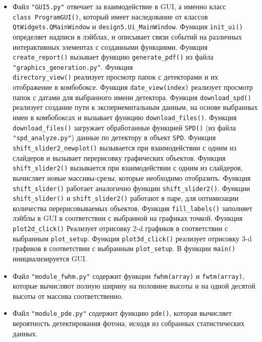 \documentclass[12pt]{article}
\begin{document}
\begin{itemize}
   \item Файл \verb|"GUI5.py"| отвечает за взаимодействие в GUI, а именно класс \\ \verb|class ProgramGUI()|, который имеет наследование от классов \\ \verb|QtWidgets.QMainWindow| и  \verb|design5.Ui_MainWindow|. Функция \verb|init_ui()| определяет надписи в лэйблах, и описывает связи событий на различных интерактивных элементах с созданными функциями. Функция \verb|create_report()| вызывает функцию \verb|generate_pdf()| из файла \verb|"graphics_generation.py"|. Функция \\ \verb|directory_view()| реализует просмотр папок с детекторами и их отображение в комбобоксе. Функция \verb|date_view(index)| реализует просмотр папок с датами для выбранного имени детектора. Функция \verb|download_spd()| реализует создание пути к экспериемнтальным данным, на основе выбранных имен в комбобоксах и вызывает функцию \verb|download_files()|. Функция \verb|download_files()| загружает обработанные функцией \verb|SPD()| (из файла \verb|"spd_analyze.py"|) данные по детектору в объект \verb|SPD|. Функция \verb|shift_slider2_newplot()| вызывается при взаимодействии с одним из слайдеров и вызывает перерисовку графических объектов. Функция \verb|shift_slider2()| вызывается при взаимодействии с одним из слайдеров, вычисляет новые массивы-срезы, которые необходимо отобразить. Функция \verb|shift_slider()| работает аналогично функции \verb|shift_slider2()|. Функции \verb|shift_slider()| и \verb|shift_slider2()| работают в паре, для оптимизации количества перерисовываемых объектов. Функция \verb|fill_labels()| заполняет лэйблы в GUI в соответствии с выбранной на графиках точкой. Функция \verb|plot2d_click()| Реализует отрисовку 2-d графиков в соответствии с выбранным \verb|plot_setup|. Функция \verb|plot3d_click()| реализует отрисовку 3-d графиков в соответствии с выбранным \verb|plot_setup|. В функции \verb|main()| инициализируется GUI. 
   
   \item Файл \verb|"module_fwhm.py"|  содержит функции \verb|fwhm(array)| и \verb|fwtm(array)|, которые вычисляют полную ширину на половине высоты и на одной десятой высоты от массива соответственно.
   
   \item Файл \verb|"module_pde.py"| содержит функцию \verb|pde()|, которая вычисляет вероятность детектирования фотона, исходя из собранных статистических данных. 
   

\end{itemize}
\end{document}
